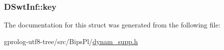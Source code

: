 \subsubsection[{\texorpdfstring{key}{key}}]{ D\+Swt\+Inf\+::key}\hypertarget{structDSwtInf_a9661c05b42d3c1c0deb724486fc685b9}{}\label{structDSwtInf_a9661c05b42d3c1c0deb724486fc685b9}


The documentation for this struct was generated from the following file\+:\begin{DoxyCompactItemize}
\item 
gprolog-\/utf8-\/tree/src/\+Bips\+Pl/\hyperlink{dynam__supp_8h}{dynam\+\_\+supp.\+h}\end{DoxyCompactItemize}

